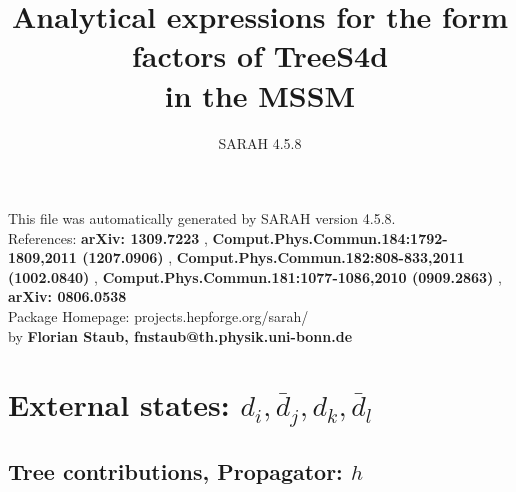 \documentclass[A4,landscape]{article}
\begin{document}
\title{Analytical expressions for the form factors of TreeS4d\\ in the MSSM } 
 \author{SARAH 4.5.8} 
 \maketitle 
 \vspace{10cm} 
This file was automatically generated by SARAH version 4.5.8.  \\ 
References: {\bf arXiv: 1309.7223 }, {\bf Comput.Phys.Commun.184:1792-1809,2011 (1207.0906) }, {\bf Comput.Phys.Commun.182:808-833,2011 (1002.0840) }, {\bf Comput.Phys.Commun.181:1077-1086,2010 (0909.2863) }, {\bf arXiv: 0806.0538 } \\ 
Package Homepage: projects.hepforge.org/sarah/ \\ 
by {\bf Florian Staub, fnstaub@th.physik.uni-bonn.de} 
 \pagebreak 
 \tableofcontents 
 \pagebreak 
\section{External states: ${d_{{i}}, \bar{d}_{{j}}, d_{{k}}, \bar{d}_{{l}}}$} 
\subsection{Tree contributions, Propagator: $h$} 
\end{document}
